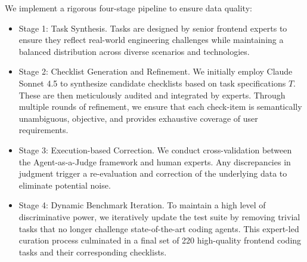 \documentclass{article}
\theoremstyle{definition}
\begin{document}
We implement a rigorous four-stage pipeline to ensure data quality:
\begin{itemize}[leftmargin=1.5em,itemsep=2pt]
\item Stage 1: Task Synthesis. Tasks are designed by senior frontend experts to ensure they reflect real-world engineering challenges while maintaining a balanced distribution across diverse scenarios and technologies.
\item Stage 2: Checklist Generation and Refinement. We initially employ Claude Sonnet 4.5 to synthesize candidate checklists based on task specifications $T$. These are then meticulously audited and integrated by experts. Through multiple rounds of refinement, we ensure that each check-item is semantically unambiguous, objective, and provides exhaustive coverage of user requirements.
\item Stage 3: Execution-based Correction. We conduct cross-validation between the Agent-as-a-Judge framework and human experts. Any discrepancies in judgment trigger a re-evaluation and correction of the underlying data to eliminate potential noise.
\item Stage 4: Dynamic Benchmark Iteration. To maintain a high level of discriminative power, we iteratively update the test suite by removing trivial tasks that no longer challenge state-of-the-art coding agents. This expert-led curation process culminated in a final set of 220 high-quality frontend coding tasks and their corresponding checklists.
\end{itemize}
\end{document}
